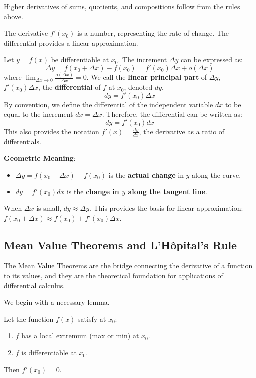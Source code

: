 Higher derivatives of sums, quotients, and compositions follow from the rules above.

The derivative $f'(x_0)$ is a number, representing the rate of change. The differential provides a linear approximation.

\begin{definition}[Differential]
Let $y = f(x)$ be differentiable at $x_0$. The increment $\Delta y$ can be expressed as:
\[
\Delta y = f(x_0 + \Delta x) - f(x_0) = f'(x_0)\Delta x + o(\Delta x)
\]
where $\lim_{\Delta x \to 0} \frac{o(\Delta x)}{\Delta x} = 0$.
We call the \textbf{linear principal part} of $\Delta y$, $f'(x_0)\Delta x$, the \textbf{differential} of $f$ at $x_0$, denoted $dy$.
\[
dy = f'(x_0) \Delta x
\]
By convention, we define the differential of the independent variable $dx$ to be equal to the increment $dx = \Delta x$.
Therefore, the differential can be written as:
\[
dy = f'(x_0) dx
\]
This also provides the notation $f'(x) = \frac{dy}{dx}$, the derivative as a ratio of differentials.
\end{definition}



\textbf{Geometric Meaning}:
\begin{itemize}
    \item $\Delta y = f(x_0 + \Delta x) - f(x_0)$ is the \textbf{actual change} in $y$ along the curve.
    \item $dy = f'(x_0) dx$ is the \textbf{change in $y$ along the tangent line}.
\end{itemize}
When $\Delta x$ is small, $dy \approx \Delta y$. This provides the basis for linear approximation: $f(x_0 + \Delta x) \approx f(x_0) + f'(x_0) \Delta x$.


\subsection{Mean Value Theorems and L'Hôpital's Rule}

The Mean Value Theorems are the bridge connecting the derivative of a function to its values, and they are the theoretical foundation for applications of differential calculus.

We begin with a necessary lemma.

\begin{theorem}
Let the function $f(x)$ satisfy at $x_0$:
\begin{enumerate}
    \item $f$ has a local extremum (max or min) at $x_0$.
    \item $f$ is differentiable at $x_0$.
\end{enumerate}
Then $f'(x_0) = 0$.
\end{theorem}

